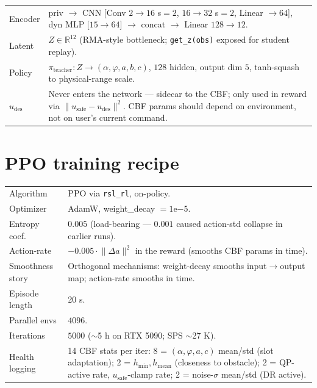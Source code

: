 \documentclass[11pt]{article}
\newcommand{\R}{\mathbb{R}}
\begin{document}
\begin{small}
\begin{tabularx}{\linewidth}{@{}lX@{}}
\toprule
Encoder         & priv $\to$ CNN [Conv $2{\to}16$ s$=2$, $16{\to}32$ s$=2$, Linear $\to 64$], dyn MLP [$15 \to 64$] $\to$ concat $\to$ Linear $128 \to 12$. \\
Latent          & $Z \in \R^{12}$ (RMA-style bottleneck; \texttt{get\_z(obs)} exposed for student replay). \\
Policy          & $\pi_{\text{teacher}}: Z \to (\alpha,\varphi,a,b,c)$, $128$ hidden, output dim $5$, tanh-squash to physical-range scale. \\
$u_{\text{des}}$ & Never enters the network --- sidecar to the CBF; only used in reward via $\lVert u_{\text{safe}}-u_{\text{des}}\rVert^{2}$. CBF params should depend on environment, not on user's current command. \\
\bottomrule
\end{tabularx}
\end{small}

\section{PPO training recipe}

\begin{small}
\begin{tabularx}{\linewidth}{@{}lX@{}}
\toprule
Algorithm       & PPO via \texttt{rsl\_rl}, on-policy. \\
Optimizer       & AdamW, weight\_decay $= 1\mathrm{e}{-5}$. \\
Entropy coef.\  & $0.005$ (load-bearing --- $0.001$ caused action-std collapse in earlier runs). \\
Action-rate     & $-0.005 \cdot \lVert \Delta a \rVert^{2}$ in the reward (smooths CBF params in time). \\
Smoothness story& Orthogonal mechanisms: weight-decay smooths input$\to$output map; action-rate smooths in time. \\
Episode length  & 20 s. \\
Parallel envs   & $4096$. \\
Iterations      & $5000$ ($\sim$5 h on RTX 5090; SPS $\sim$27 K). \\
Health logging  & 14 CBF stats per iter: 8 = $(\alpha,\varphi,a,c)$ mean/std (slot adaptation); 2 = $h_{\min}, h_{\text{mean}}$ (closeness to obstacle); 2 = QP-active rate, $u_{\text{safe}}$-clamp rate; 2 = noise-$\sigma$ mean/std (DR active). \\
\bottomrule
\end{tabularx}
\end{small}
\end{document}
